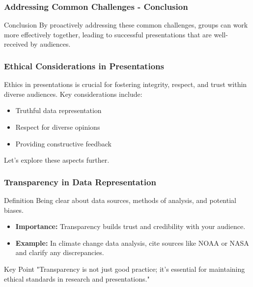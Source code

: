 \documentclass[aspectratio=169]{beamer}
\begin{document}
\begin{frame}[fragile]
    \frametitle{Addressing Common Challenges - Conclusion}
    \begin{block}{Conclusion}
        By proactively addressing these common challenges, groups can work more effectively together, leading to successful presentations that are well-received by audiences.
    \end{block}
\end{frame}

\begin{frame}[fragile]
    \frametitle{Ethical Considerations in Presentations}
    Ethics in presentations is crucial for fostering integrity, respect, and trust within diverse audiences. Key considerations include:
    \begin{itemize}
        \item Truthful data representation
        \item Respect for diverse opinions
        \item Providing constructive feedback
    \end{itemize}
    Let’s explore these aspects further.
\end{frame}

\begin{frame}[fragile]
    \frametitle{Transparency in Data Representation}
    \begin{block}{Definition}
        Being clear about data sources, methods of analysis, and potential biases.
    \end{block}
    
    \begin{itemize}
        \item \textbf{Importance:} Transparency builds trust and credibility with your audience.
        \item \textbf{Example:} In climate change data analysis, cite sources like NOAA or NASA and clarify any discrepancies.
    \end{itemize}
    
    \begin{block}{Key Point}
        "Transparency is not just good practice; it's essential for maintaining ethical standards in research and presentations."
    \end{block}
\end{frame}
\end{document}
